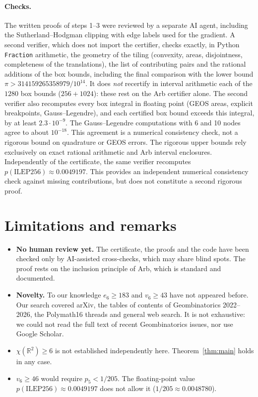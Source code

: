 \documentclass[10pt,a4paper]{article}
\newcommand{\R}{\mathbb{R}}
\begin{document}
\paragraph{Checks.} The written proofs of steps 1--3 were reviewed by a separate AI agent, including
the Sutherland--Hodgman clipping with edge labels used for the gradient. A second verifier, which does
not import the certifier, checks exactly, in Python \texttt{Fraction} arithmetic, the geometry of the
tiling (convexity, areas, disjointness, completeness of the translations), the list of contributing
pairs and the rational additions of the box bounds, including the final comparison with the lower
bound $\pi>314159265358979/10^{14}$. It does \emph{not} recertify in interval arithmetic each of the
$1280$ box bounds ($256+1024$): these rest on the Arb certifier alone. The second verifier also
recomputes every box integral in floating point (GEOS areas, explicit breakpoints, Gauss--Legendre),
and each certified box bound exceeds this integral, by at least $2.3\cdot10^{-9}$. The
Gauss--Legendre computations with 6 and 10 nodes agree to about $10^{-18}$. This agreement is a
numerical consistency check, not a rigorous bound on quadrature or GEOS errors. The rigorous upper
bounds rely exclusively on exact rational arithmetic and Arb interval enclosures. Independently of the
certificate, the same verifier recomputes $p(\mathrm{ILEP256})\approx0.0049197$. This provides an independent numerical consistency check against missing contributions, but does not
constitute a second rigorous proof.

\section{Limitations and remarks}

\begin{itemize}
\item \textbf{No human review yet.} The certificate, the proofs and the code have been checked only by
AI-assisted cross-checks, which may share blind spots. The proof rests on the inclusion principle of
Arb, which is standard and documented.
\item \textbf{Novelty.} To our knowledge $e_6\ge183$ and $v_6\ge43$ have not appeared before.
Our search covered arXiv, the tables of contents of Geombinatorics 2022--2026, the Polymath16 threads and
general web search. It is not exhaustive: we could not read the full text of recent Geombinatorics
issues, nor use Google Scholar.
\item \textbf{$\chi(\R^2)\ge6$} is not established independently here. Theorem~\ref{thm:main} holds in
any case.
\item \textbf{$v_6\ge46$} would require $p_5<1/205$. The floating-point value $p(\mathrm{ILEP256})\approx0.0049197$
does not allow it ($1/205\approx0.0048780$).
\end{itemize}
\end{document}
